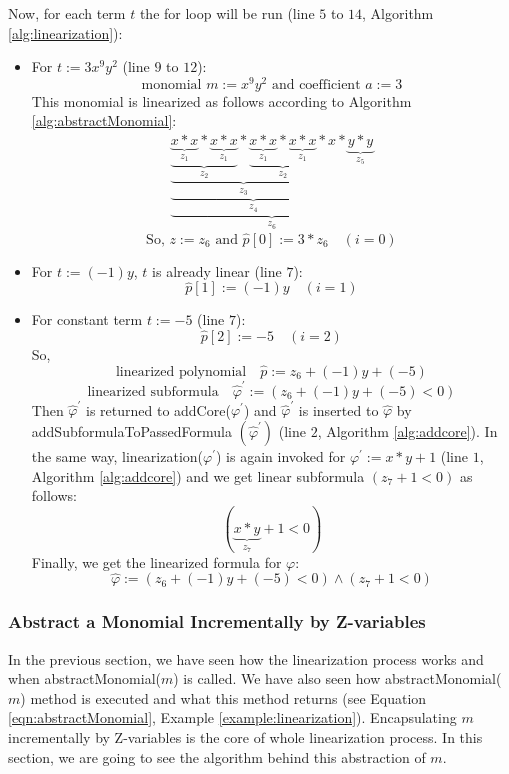 \begin{example}
\noindent Now, for each term $t$ the for loop will be run (line $5$ to $14$, Algorithm \ref{alg:linearization}):
\begin{itemize}
	\item For $t := 3x^9y^2$ (line $9$ to $12$):
	$$\text{monomial }m := x^9y^2 \text{ and coefficient } a := 3$$
	This monomial is linearized as follows according to Algorithm \ref{alg:abstractMonomial}:
	\begin{align}
	    \underbrace{ \underbrace{ \underbrace{ \underbrace{ \underbrace{ x \ast x }\limits_{z_{1}} \ast \underbrace{ x \ast x }\limits_{z_{1}}}\limits_{z_{2}} \ast \underbrace{ \underbrace{ x \ast x }\limits_{z_{1}} \ast \underbrace{ x \ast x }\limits_{z_{1}}}\limits_{z_{2}}}\limits_{z_{3}} \ast x}\limits_{z_{4}} \ast \underbrace{ y \ast y }\limits_{z_{5}}}\limits_{z_{6}} \label{eqn:abstractMonomial}
	\end{align}
	$$\text{So, }z := z_{6}\text{ and } \hat{p}[0] := 3 \ast z_{6} \quad (i = 0)$$
    \item For $t := (-1)y$, $t$ is already linear (line $7$):
    $$\hat{p}[1] := (-1)y \quad (i = 1)$$
    \item For constant term $t := -5$ (line $7$):
    $$\hat{p}[2] := -5 \quad (i = 2)$$
So,
$$\text{linearized polynomial} \quad \hat{p} := z_{6} + (-1)y + (-5)$$
$$\text{linearized subformula} \quad \hat{\varphi}^\prime := ( z_{6} + (-1)y + (-5) < 0 )$$
Then $\hat{\varphi}^\prime$ is returned to addCore($\varphi^\prime$) and $\hat{\varphi}^\prime$ is inserted to $\hat{\varphi}$ by addSubformulaToPassedFormula $( \hat{\varphi}^\prime )$ (line $2$, Algorithm \ref{alg:addcore}).
In the same way, linearization($\varphi^\prime$) is again invoked for $\varphi^\prime:= x \ast y + 1$ (line $1$, Algorithm \ref{alg:addcore}) and  we get linear subformula $( z_{7} + 1 < 0 )$ as follows:
$$(\underbrace{ x \ast y }\limits_{z_{7}} + 1 < 0)$$
Finally, we get the linearized formula for $\varphi$:
$$\hat{\varphi} := ( z_{6} + (-1)y + (-5) < 0 ) \wedge ( z_{7} + 1 < 0 )$$
\end{itemize}
\end{example}
\subsubsection{Abstract a Monomial Incrementally by Z-variables}
\label{subsubsec:Abstract_A_Monomial_IncrementallyBy_Z-variables}
In the previous section, we have seen how the linearization process works and when abstractMonomial($m$) is called.
We have also seen how abstractMonomial($m$) method is executed and what this method returns (see Equation \ref{eqn:abstractMonomial}, Example \ref{example:linearization}). 
Encapsulating $m$ incrementally by Z-variables is the core of whole linearization process.
In this section, we are going to see the algorithm behind this abstraction of $m$.\newline


